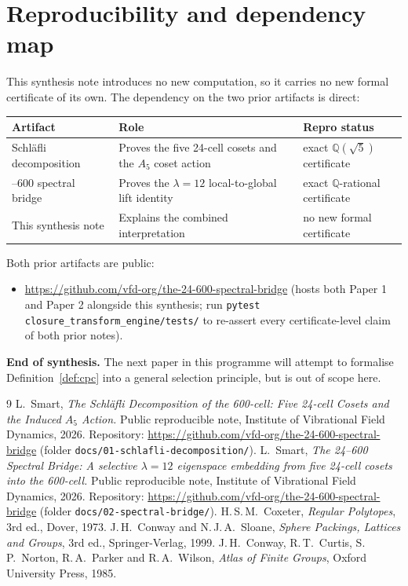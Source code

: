 \documentclass[11pt]{article}
\theoremstyle{definition}
\begin{document}
\section{Reproducibility and dependency map}\label{sec:repro}

This synthesis note introduces no new computation, so it carries no
new formal certificate of its own.  The dependency on the two prior
artifacts is direct:

\medskip
\noindent
\begin{tabular}{p{}p{}p{}}
\toprule
Artifact & Role & Repro status \\
\midrule
Schl\"afli decomposition~\cite{SmartSchlafli2026}
  & Proves the five 24-cell cosets and the $A_5$ coset action
  & exact $\mathbb{Q}(\sqrt 5)$ certificate \\
\addlinespace
24--600 spectral bridge~\cite{SmartBridge2026}
  & Proves the $\lambda=12$ local-to-global lift identity
  & exact $\mathbb{Q}$-rational certificate \\
\addlinespace
This synthesis note
  & Explains the combined interpretation
  & no new formal certificate \\
\bottomrule
\end{tabular}
\medskip

Both prior artifacts are public:
\begin{itemize}
  \item \url{https://github.com/vfd-org/the-24-600-spectral-bridge}
        (hosts both Paper 1 and Paper 2 alongside this synthesis;
        run \texttt{pytest closure\_transform\_engine/tests/} to
        re-assert every certificate-level claim of both prior
        notes).
\end{itemize}

\bigskip
\noindent
\textbf{End of synthesis.}  The next paper in this programme will
attempt to formalise Definition~\ref{def:cpc} into a general
selection principle, but is out of scope here.

\begin{thebibliography}{9}
L.~Smart, \emph{The Schl\"afli Decomposition of the 600-cell:
Five 24-cell Cosets and the Induced $A_5$ Action.}
Public reproducible note, Institute of Vibrational Field Dynamics,
2026.  Repository:
\url{https://github.com/vfd-org/the-24-600-spectral-bridge}
(folder \texttt{docs/01-schlafli-decomposition/}).
L.~Smart, \emph{The 24--600 Spectral Bridge: A selective $\lambda=12$
eigenspace embedding from five 24-cell cosets into the 600-cell.}
Public reproducible note, Institute of Vibrational Field Dynamics,
2026.  Repository:
\url{https://github.com/vfd-org/the-24-600-spectral-bridge}
(folder \texttt{docs/02-spectral-bridge/}).
H.\,S.\,M.~Coxeter, \emph{Regular Polytopes}, 3rd ed., Dover, 1973.
J.\,H.~Conway and N.\,J.\,A.~Sloane, \emph{Sphere Packings, Lattices
and Groups}, 3rd ed., Springer-Verlag, 1999.
J.\,H.~Conway, R.\,T.~Curtis, S.\,P.~Norton, R.\,A.~Parker and
R.\,A.~Wilson, \emph{Atlas of Finite Groups}, Oxford University
Press, 1985.
\end{thebibliography}
\end{document}
